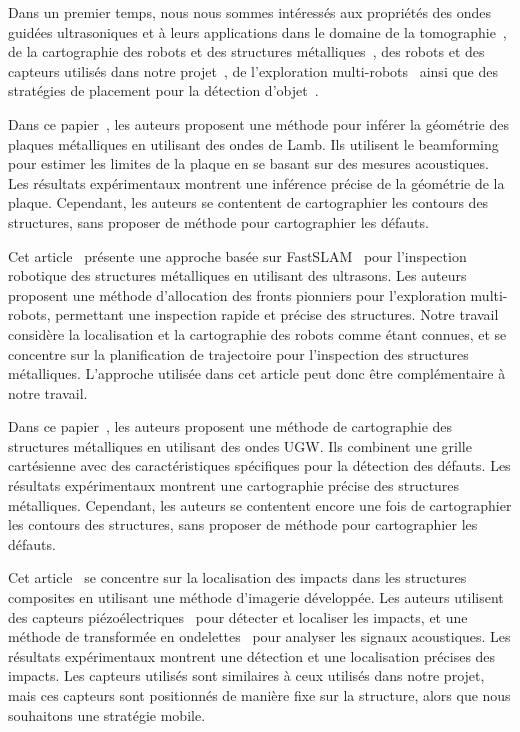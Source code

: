 \documentclass[francais,RandD]{rapportPFE}
\begin{document}
		Dans un premier temps, nous nous sommes intéressés aux propriétés des ondes guidées ultrasoniques et à leurs applications dans le domaine de la tomographie~\cite{OUABI2022106705, HUTHWAITE2013979}, de la cartographie des robots et des structures métalliques~\cite{9364359, 9811581, inventions3030059, 9568841}, des robots et des capteurs utilisés dans notre projet~\cite{s22093235}, de l'exploration multi-robots~\cite{bautin:hal-00757960, articlesvsdf} ainsi que des stratégies de placement pour la détection d'objet~\cite{article455556, 7487624, 7139673}.

		Dans ce papier~\cite{OUABI2022106705}, les auteurs proposent une méthode pour inférer la géométrie des plaques métalliques en utilisant des ondes de Lamb.
		Ils utilisent le beamforming~\cite{enwiki:1151960654} pour estimer les limites de la plaque en se basant sur des mesures acoustiques.
		Les résultats expérimentaux montrent une inférence précise de la géométrie de la plaque.
		Cependant, les auteurs se contentent de cartographier les contours des structures, sans proposer de méthode pour cartographier les défauts.

		Cet article~\cite{9364359} présente une approche basée sur FastSLAM~\cite{article254524} pour l'inspection robotique des structures métalliques en utilisant des ultrasons.
		Les auteurs proposent une méthode d'allocation des fronts pionniers pour l'exploration multi-robots, permettant une inspection rapide et précise des structures.
		Notre travail considère la localisation et la cartographie des robots comme étant connues, et se concentre sur la planification de trajectoire pour l'inspection des structures métalliques.
		L'approche utilisée dans cet article peut donc être complémentaire à notre travail.

		Dans ce papier~\cite{9811581}, les auteurs proposent une méthode de cartographie des structures métalliques en utilisant des ondes UGW.
		Ils combinent une grille cartésienne avec des caractéristiques spécifiques pour la détection des défauts.
		Les résultats expérimentaux montrent une cartographie précise des structures métalliques.
		Cependant, les auteurs se contentent encore une fois de cartographier les contours des structures, sans proposer de méthode pour cartographier les défauts.

		Cet article~\cite{inventions3030059} se concentre sur la localisation des impacts dans les structures composites en utilisant une méthode d'imagerie développée.
		Les auteurs utilisent des capteurs piézoélectriques~\cite{enwiki:1154129092} pour détecter et localiser les impacts, et une méthode de transformée en ondelettes~\cite{enwiki:1147185762} pour analyser les signaux acoustiques.
		Les résultats expérimentaux montrent une détection et une localisation précises des impacts.
		Les capteurs utilisés sont similaires à ceux utilisés dans notre projet, mais ces capteurs sont positionnés de manière fixe sur la structure, alors que nous souhaitons une stratégie mobile.
\end{document}

